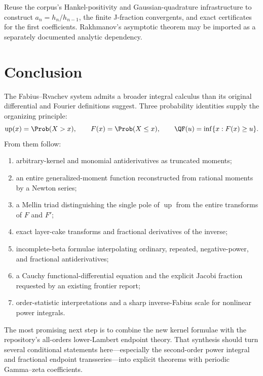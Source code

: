 \documentclass[11pt,oneside]{article}
\theoremstyle{definition}
\theoremstyle{remark}
\newcommand{\Up}{\operatorname{up}}
\newcommand{\1}{\mathbf 1}
\begin{document}
\begin{obligation}
Reuse the corpus's Hankel-positivity and Gaussian-quadrature infrastructure to
construct \(a_n=h_n/h_{n-1}\), the finite J-fraction convergents, and exact
certificates for the first coefficients.  Rakhmanov's asymptotic theorem may be
imported as a separately documented analytic dependency.
\end{obligation}

\section{Conclusion}
\label{p8:sec:conclusion}

The Fabius--Rvachev system admits a broader integral calculus than its original
differential and Fourier definitions suggest.  Three probability identities
supply the organizing principle:
\begin{equation}
 \Up(x)=\Prob(X>x),
 \qquad
 F(x)=\Prob(X\le x),
 \qquad
 \QF(u)=\inf\{x:F(x)\ge u\}.
 \label{p8:eq:three-probability-objects}
\end{equation}
From them follow:
\begin{enumerate}
\item arbitrary-kernel and monomial antiderivatives as truncated moments;
\item an entire generalized-moment function reconstructed from rational moments
      by a Newton series;
\item a Mellin triad distinguishing the single pole of \(\Up\) from the entire
      transforms of \(F\) and \(F'\);
\item exact layer-cake transforms and fractional derivatives of the inverse;
\item incomplete-beta formulae interpolating ordinary, repeated, negative-power,
      and fractional antiderivatives;
\item a Cauchy functional-differential equation and the explicit Jacobi fraction
      requested by an existing frontier report;
\item order-statistic interpretations and a sharp inverse-Fabius scale for
      nonlinear power integrals.
\end{enumerate}

The most promising next step is to combine the new kernel formulae with the
repository's all-orders lower-Lambert endpoint theory.  That synthesis should
turn several conditional statements here---especially the second-order power
integral and fractional endpoint transseries---into explicit theorems with
periodic Gamma--zeta coefficients.
\end{document}
